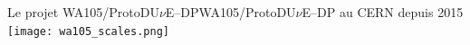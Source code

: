 
    \begin{frame}{Le projet WA105/ProtoDU$\nu$E--DP}{WA105/\texorpdfstring{ProtoDU$\nu$E}{ProtoDUNE}--DP au CERN depuis 2015}
        \centering
       	\vspace{-0.5cm}\hspace{-0.4cm}\texttt{[image: wa105\_scales.png]}
    \end{frame}
    
